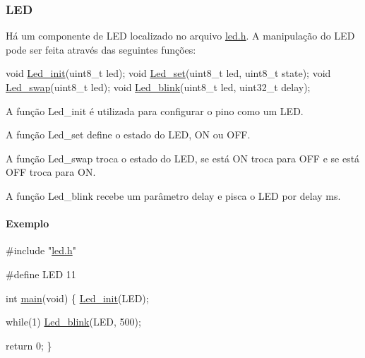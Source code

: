 \subsubsection*{L\+ED}

Há um componente de L\+ED localizado no arquivo {\ttfamily \mbox{\hyperlink{led_8h}{led.\+h}}}. A manipulação do L\+ED pode ser feita através das seguintes funções\+:


\begin{DoxyCode}
\textcolor{keywordtype}{void} \mbox{\hyperlink{led_8h_a2d207c115e6c59077fddfb3696a71686}{Led\_init}}(uint8\_t led);
\textcolor{keywordtype}{void} \mbox{\hyperlink{led_8h_aee0154d3c2f16fff19fab871a3cf5468}{Led\_set}}(uint8\_t led, uint8\_t state);
\textcolor{keywordtype}{void} \mbox{\hyperlink{led_8h_acd33cc1fd492aaea2d710ef97b8b6993}{Led\_swap}}(uint8\_t led);
\textcolor{keywordtype}{void} \mbox{\hyperlink{led_8h_a2713c59befc263ea9e8f33a4cede5de7}{Led\_blink}}(uint8\_t led, uint32\_t delay);
\end{DoxyCode}



\begin{DoxyItemize}
\item A função {\ttfamily Led\+\_\+init} é utilizada para configurar o pino como um L\+ED.
\item A função {\ttfamily Led\+\_\+set} define o estado do L\+ED, {\ttfamily ON} ou {\ttfamily O\+FF}.
\item A função {\ttfamily Led\+\_\+swap} troca o estado do L\+ED, se está {\ttfamily ON} troca para {\ttfamily O\+FF} e se está {\ttfamily O\+FF} troca para {\ttfamily ON}.
\item A função {\ttfamily Led\+\_\+blink} recebe um parâmetro {\ttfamily delay} e pisca o L\+ED por {\ttfamily delay} ms.
\end{DoxyItemize}

\paragraph*{Exemplo}


\begin{DoxyCode}
\textcolor{preprocessor}{#include "\mbox{\hyperlink{led_8h}{led.h}}"}

\textcolor{preprocessor}{#define LED 11}

\textcolor{keywordtype}{int} \mbox{\hyperlink{main_8c_a840291bc02cba5474a4cb46a9b9566fe}{main}}(\textcolor{keywordtype}{void}) \{
  \mbox{\hyperlink{led_8h_a2d207c115e6c59077fddfb3696a71686}{Led\_init}}(LED);

  \textcolor{keywordflow}{while}(1)  
    \mbox{\hyperlink{led_8h_a2713c59befc263ea9e8f33a4cede5de7}{Led\_blink}}(LED, 500);

  \textcolor{keywordflow}{return} 0;
\}
\end{DoxyCode}


